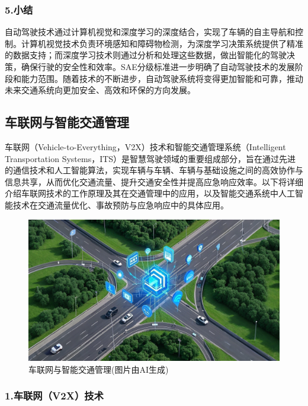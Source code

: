 \subsubsection{5.小结}

自动驾驶技术通过计算机视觉和深度学习的深度结合，实现了车辆的自主导航和控制。计算机视觉技术负责环境感知和障碍物检测，为深度学习决策系统提供了精准的数据支持；而深度学习技术则通过分析和处理这些数据，做出智能化的驾驶决策，确保行驶的安全性和效率。SAE分级标准进一步明确了自动驾驶技术的发展阶段和能力范围。随着技术的不断进步，自动驾驶系统将变得更加智能和可靠，推动未来交通系统向更加安全、高效和环保的方向发展。

\subsection{车联网与智能交通管理}

车联网（Vehicle-to-Everything，V2X）技术和智能交通管理系统（Intelligent Transportation Systems，ITS）是智慧驾驶领域的重要组成部分，旨在通过先进的通信技术和人工智能算法，实现车辆与车辆、车辆与基础设施之间的高效协作与信息共享，从而优化交通流量、提升交通安全性并提高应急响应效率。以下将详细介绍车联网技术的工作原理及其在交通管理中的应用，以及智能交通系统中人工智能技术在交通流量优化、事故预防与应急响应中的具体应用。

\begin{figure}[ht]
  \centering
  \includegraphics[width=\linewidth]{image/4/新_智能交通.png}
  \caption{车联网与智能交通管理(图片由AI生成)}
  \label{fig:智能交通}
\end{figure}

\subsubsection{1.车联网（V2X）技术}

